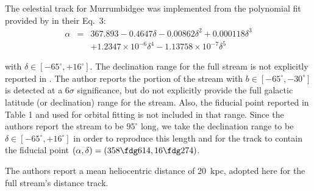 The celestial track for Murrumbidgee was implemented from the polynomial fit provided by \citet{Grillmair2017_south}
in their Eq.~3:
\begin{eqnarray*}
\alpha &=& 367.893 -0.4647\delta - 0.00862\delta^2 + 0.000118\delta^3 \\
       & & +1.2347\times 10^{-6}\delta^4 - 1.13758\times 10^{-7}\delta^5
\end{eqnarray*}

with $\delta \in [-65^\circ,+16^\circ]$. The declination range for the full stream is not explicitly reported in \citet{Grillmair2017_south}. 
The author reports the portion of the stream with $b \in [-65^\circ,-30^\circ]$ is detected at a 
$6\sigma$ significance, but do not explicitly provide the full galactic latitude (or declination) range for the stream. 
Also, the fiducial point reported in Table 1 and used for orbital fitting is not included in that range. 
Since the authors report the stream to be $95^\circ$ long, we take the declination range to be 
$\delta \in [-65^\circ,+16^\circ]$ in order to reproduce this length and for the track to contain the fiducial point
$(\alpha,\delta)=(358\fdg614, 16\fdg274)$.

The authors report a mean heliocentric distance of 20~kpc, adopted here for the full stream's distance track.
